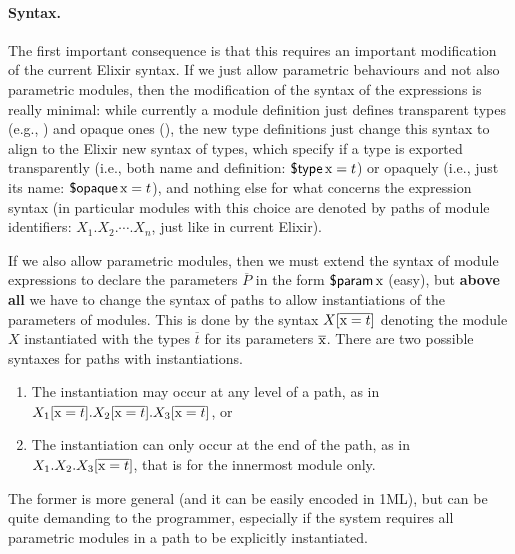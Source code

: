 \documentclass[a4paper,10pt]{article}
\begin{document}
\paragraph{Syntax.} The first important consequence is that this requires an important modification of the current Elixir syntax. If we just allow parametric behaviours and not also parametric modules, then the modification of the syntax of the expressions is really minimal: while currently a module definition just defines transparent types (e.g., ) and opaque ones (), the new type definitions just change this syntax to align to the Elixir new syntax of types, which specify if a type is exported transparently (i.e., both name and definition: $\operatorname{\textsf{\$type}} \text{\rm x} = t$) or opaquely (i.e., just its name: $\operatorname{\textsf{\$opaque}} \text{\rm x} = t$), and nothing else for what concerns the expression syntax (in particular modules with this choice are denoted by paths of module identifiers: $X_1.X_2.\cdots{.}X_n$, just like in current Elixir).

If we also allow parametric modules, then we must extend the syntax of module expressions to declare the parameters $\overline P$ in the form $\operatorname{\textsf{\$param}} \text{\rm x}$ (easy), but \textbf{above all} we have to change the syntax of paths to allow instantiations of the parameters of modules. This is done by the syntax $X[\overline{\text{\rm x}=t}]$ denoting the module $X$ instantiated with the types $\overline{t}$ for its parameters $\overline{\text{\rm x}}$. 
There are two possible syntaxes for paths with instantiations.
\begin{enumerate}
\item The instantiation may occur at any level of a path, as in $X_1[\overline{\text{\rm x}=t}].X_2[\overline{\text{\rm x}=t}].X_3[\overline{\text{\rm x}=t}]$, or
\item The instantiation can only occur at the end of the path, as in $X_1.X_2.X_3[\overline{\text{\rm x}=t}]$, that is for the innermost module only.
\end{enumerate}
 The former is more general (and it can be easily encoded in 1ML), but can be quite demanding to the programmer, especially if the system requires all parametric modules in a path to be explicitly instantiated.
\end{document}
